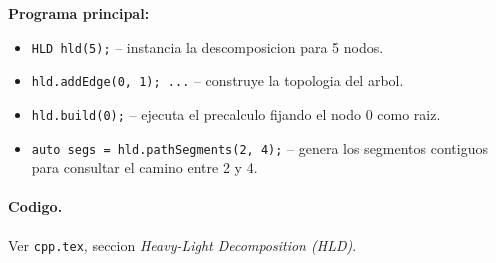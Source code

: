\textbf{Programa principal:}
\begin{itemize}\setlength\itemsep{0pt}
	\item \verb|HLD hld(5);| -- instancia la descomposicion para 5 nodos.
	\item \verb|hld.addEdge(0, 1); ...| -- construye la topologia del arbol.
	\item \verb|hld.build(0);| -- ejecuta el precalculo fijando el nodo 0 como raiz.
	\item \verb|auto segs = hld.pathSegments(2, 4);| -- genera los segmentos contiguos para consultar el camino entre 2 y 4.
\end{itemize}

\paragraph{Codigo.}
Ver \texttt{cpp.tex}, seccion \textit{Heavy-Light Decomposition (HLD)}.

\vspace{0.5em}
